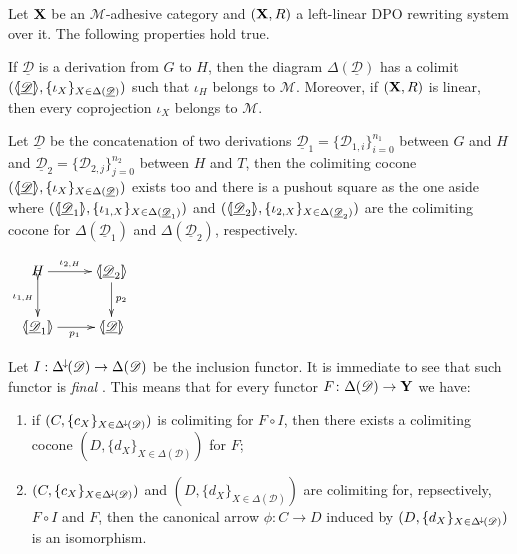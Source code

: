 \documentclass[a4paper,UKenglish,cleveref,pdftex,thm-restate,numberwithinsect,anonymous]{lipics}
\newcommand{\Deltamin}{\Delta^{\hspace{-1pt}\downarrow\hspace{-1pt}}}
\def\R{\mathsf{R}}
\def\X{\textbf {\textup{X}}}
\def\Y{\textbf {\textup{Y}}}
\newcommand{\dder}[1]{\mathscr{#1}}
\newcommand{\der}[1]{\underline{\dder{#1}}}
\newcommand{\lpro}{\langle \hspace{-1.85pt}[}
\newcommand{\rpro}{]\hspace{-1.85pt}\rangle}
\newcommand{\tpro}[1]{\lpro \der{#1}\rpro}
\newcommand{\tproi}[2]{\lpro \der{#1}_{#2}\rpro}
\begin{document}
\begin{lemma}\label{lem:colim}
	Let $\X$ be an $\mathcal{M}$-adhesive category and $(\X, \R)$ a
	left-linear DPO rewriting system over it. The following properties
	hold true.
	\begin{enumerate}
		\item  If $\der{D}$ is a derivation from $G$ to $H$, then the diagram $\Delta(\der{D})$ has a colimit $(\tpro{D}, \{\iota_X\}_{X\in \Delta(\der{D})})$ such that $\iota_H$ belongs to $\mathcal{M}$. Moreover, if $(\X, \R)$ is linear, then every coprojection $\iota_X$ belongs to $\mathcal{M}$.
		
		\parbox{10cm}{
		\item Let $\der{D}$ be the concatenation of two derivations $\der{D}_1=\{\dder{D}_{1,i}\}_{i=0}^{n_1}$ between $G$ and $H$ and $\der{D}_2=\{\dder{D}_{2,j}\}_{j=0}^{n_2}$ between $H$ and $T$,  then the colimiting cocone $(\tpro{D}, \{\iota_X\}_{X\in \Delta(\der{D})})$ exists too and there is a pushout square as the one aside
		where $(\tproi{D}{1}, \{\iota_{1, X}\}_{X\in \Delta(\der{D}_1)})$ and $(\tproi{D}{2}, \{\iota_{2, X}\}_{X\in \Delta(\der{D}_2)})$ are the colimiting cocone for $\Delta(\der{D}_1)$ and $\Delta(\der{D}_2)$, respectively.} 
		\parbox{3cm}{\vspace{-.5cm}
		$\xymatrix{H\ar[r]^-{\iota_{2, H}} \ar@{>->}[d]_-{\iota_{1, H}} & \tproi{D}{2} \ar[d]^{p_2}\\  \tproi{D}{1} \ar[r]_{p_1}& \tpro{D}}$}
	\end{enumerate}
\end{lemma}
\begin{remark}\label{rem:cof}
	Let $I:\Deltamin(\dder{D})\to \Delta(\dder{D})$ be the inclusion functor. It is immediate to see that such functor is \emph{final} \cite{mac2013categories}. This means that for every functor $F\colon \Delta(\dder{D})\to \Y$ we have:
	\begin{enumerate}
		\item if  $(C, \{c_X\}_{X\in \Deltamin(\dder{D})})$ is colimiting for $F\circ I$, then there exists a colimiting cocone $(D, \{d_X\}_{X\in \Delta(\dder{D})})$ for $F$;
		\item $(C, \{c_X\}_{X\in \Deltamin(\dder{D})})$ and $(D, \{d_X\}_{X\in \Delta(\dder{D})})$ are colimiting for, repsectively, $F\circ I$ and $F$, then the canonical arrow $\phi\colon C\to D$ induced by $(D, \{d_X\}_{X\in \Deltamin(\dder{D})})$ is an isomorphism.
	\end{enumerate}
\end{remark}
\end{document}
